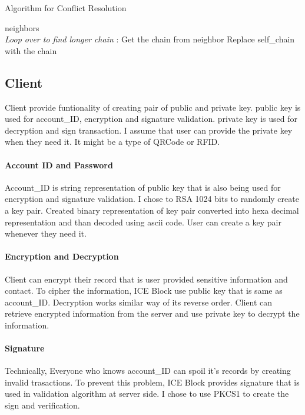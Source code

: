 \documentclass[conference]{IEEEtran}
\begin{document}
\begin{algorithm}
    \caption{Algorithm for Conflict Resolution}
    \begin{algorithmic}[1]
        \renewcommand{\algorithmicrequire}{\textbf{Input:}}
        \renewcommand{\algorithmicensure}{\textbf{Output:}}
        \REQUIRE neighbors
        \\ \textit{Loop over to find longer chain} :
            \STATE Get the chain from neighbor
                \STATE Replace self\_chain with the chain
            \ENDIF
        \ENDFOR
    \end{algorithmic} 
\end{algorithm}


\subsection{Client}
Client provide funtionality of creating pair of public and private key.
public key is used for account\_ID, encryption and signature validation.
private key is used for decryption and sign transaction.
I assume that user can provide the private key when they need it. It might be a type of QRCode or RFID.

\paragraph{Account ID and Password}
Account\_ID is string representation of public key that is also being used for encryption and signature validation.
I chose to RSA 1024 bits to randomly create a key pair. Created binary representation of key pair converted into hexa decimal representation and than decoded using ascii code.
User can create a key pair whenever they need it. 
 
\paragraph{Encryption and Decryption}
Client can encrypt their record that is user provided sensitive information and contact.
To cipher the information, ICE Block use public key that is same as account\_ID.
Decryption works similar way of its reverse order. Client can retrieve encrypted information from the server and use private key to decrypt the information.


\paragraph{Signature}
Technically, Everyone who knows account\_ID can spoil it's records by creating invalid trasactions.
To prevent this problem, ICE Block provides signature that is used in validation algorithm at server side.
I chose to use PKCS1 to create the sign and verification.
\end{document}
